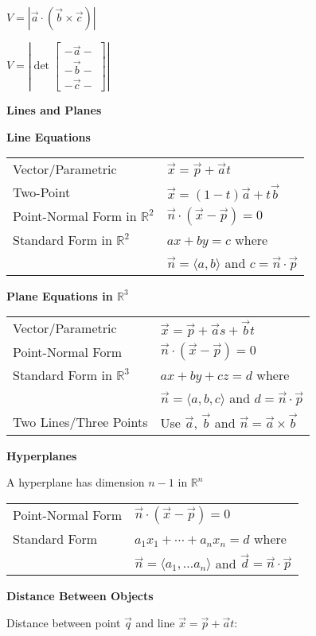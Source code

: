 \documentclass[10pt]{article}
\newcommand{\R}{{\mathbb R}}
\newcommand\sectionheading[1]{\begin{center}\large{\textbf{#1}}\end{center}\normalsize}
\newcommand\heading[1]{\medskip\textbf{#1}\medskip}
\begin{document}
\begin{multicols*}{3}
$V=|\vec a\cdot(\vec b\times\vec c)|$

$V=\left|\det\begin{bmatrix}
    -\vec a- \\
    -\vec b- \\
    -\vec c- 
\end{bmatrix}\right|$

\sectionheading{Lines and Planes}

\heading{Line Equations}

\begin{tabular}{@{}ll}
    Vector/Parametric & $\vec x = \vec p + \vec a t$ \\
    Two-Point & $\vec x = (1-t)\vec a + t\vec b$ \\
    Point-Normal Form in $\R^2$ & $\vec n \cdot (\vec x - \vec p) = 0$ \\
    Standard Form in $\R^2$ & $ax+by=c$ where \\
    & $\vec n=\langle a,b\rangle$ and $c=\vec n\cdot\vec p$
\end{tabular}

\heading{Plane Equations in $\R^3$}

\begin{tabular}{@{}ll}
    Vector/Parametric & $\vec x=\vec p+\vec a s + \vec b t$ \\
    Point-Normal Form & $\vec n \cdot (\vec x - \vec p) = 0$ \\
    Standard Form in $\R^3$ & $ax+by+cz=d$ where\\
    & $\vec n=\langle a,b,c\rangle$ and $d=\vec n\cdot \vec p$ \\
    Two Lines/Three Points & Use $\vec a$, $\vec b$ and $\vec n=\vec a\times\vec b$ \\
\end{tabular}

\heading{Hyperplanes}

A hyperplane has dimension $n-1$ in $\R^n$

\begin{tabular}{@{}ll}
    Point-Normal Form & $\vec n \cdot (\vec x - \vec p) = 0$ \\
    Standard Form & $a_1x_1+\cdots+a_nx_n=d$ where \\
    & $\vec n=\langle a_1,\ldots a_n\rangle$ and $\vec d=\vec n\cdot\vec p$
\end{tabular}

\heading{Distance Between Objects}

Distance between point $\vec q$ and line $\vec x=\vec p+\vec a t$:


\end{multicols*}
\end{document}
